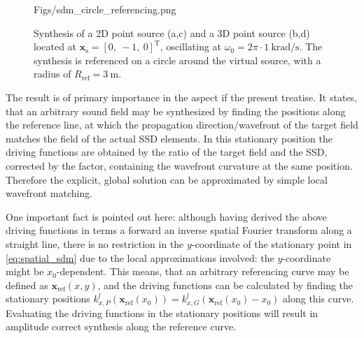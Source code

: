 \documentclass[12pt,a4paper]{article}
\newcommand{\vxref}{\mathbf{x}_{\mathrm{ref}}}
\newcommand{\vxs}{\mathbf{x}_{\mathrm{s}}}
\begin{document}
\begin{figure}
	\centering
	\begin{overpic}[width = .95\columnwidth ]{Figs/sdm_circle_referencing.png}
	\scriptsize
	\end{overpic}
	\caption{Synthesis of a 2D point source (a,c) and a 3D point source (b,d) located at $\vxs = [0,\ -1,\ 0]^\mathrm{T}$, oscillating at $\omega_0 = 2\pi \cdot 1 ~\mathrm{krad/s}$. The synthesis is referenced on a circle around the virtual source, with a radius of $R_{\mathrm{ref}} = 3~\mathrm{m}$.}
	\label{fig:sdm_spatial_1}
\end{figure}

The result is of primary importance in the aspect if the present treatise.
It states, that an arbitrary sound field may be synthesized by finding the positions along the reference line, at which the propagation direction/wavefront of the target field matches the field of the actual SSD elements.
In this stationary position the driving functions are obtained by the ratio of the target field and the SSD, corrected by the factor, containing the wavefront curvature at the same position.
Therefore the explicit, global solution can be approximated by simple local wavefront matching.

One important fact is pointed out here: although having derived the above driving functions in terms a forward an inverse spatial Fourier transform along a straight line, there is no restriction in the $y$-coordinate of the stationary point in \eqref{eq:spatial_sdm} due to the local approximations involved: the $y$-coordinate might be $x_0$-dependent.
This means, that an arbitrary referencing curve may be defined as $\vxref(x,y)$, and the driving functions can be calculated by finding the stationary positions $k_{x,P}^l(\vxref(x_0)) = k_{x,G}^l(\vxref(x_0) - x_0)$ along this curve.
Evaluating the driving functions in the stationary positions will result in amplitude correct synthesis along the reference curve. 
\end{document}
